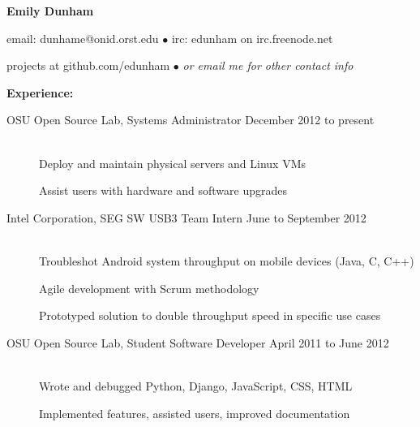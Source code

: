 \documentclass[11pt]{article}
\begin{document}
\centerline{{\LARGE \bf Emily Dunham}}

\bigskip

\centerline{email: dunhame@onid.orst.edu
        $\bullet$
        irc: edunham on irc.freenode.net}
\centerline{projects at github.com/edunham 
        $\bullet$
        \emph{or email me for other contact info}}

\bigskip
\hrulefill
\bigskip

{\Large \bf Experience:}
\begin{description}
\item[OSU Open Source Lab, Systems Administrator 
    \hfill December 2012 to present]
    \hfill \\
    Deploy and maintain physical servers and Linux VMs

    Assist users with hardware and software upgrades

\item[Intel Corporation, SEG SW USB3 Team Intern
    \hfill June to September 2012]
    \hfill \\
    Troubleshot Android system throughput on mobile devices (Java, C, C++)

    Agile development with Scrum methodology

    Prototyped solution to double throughput speed in specific use cases

\item[OSU Open Source Lab, Student Software Developer 
    \hfill April 2011 to June 2012]
    \hfill \\
    Wrote and debugged Python, Django, JavaScript, CSS, HTML

    Implemented features, assisted users, improved documentation
\end{description}

\smallskip
\hrulefill
\bigskip
\end{document}
